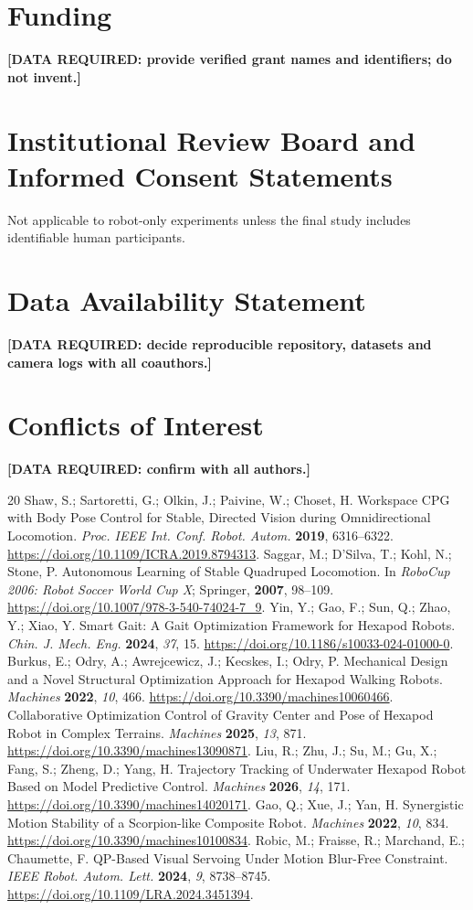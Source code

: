 \documentclass[11pt,a4paper]{article}
\newcommand{\todoexp}[1]{\textcolor{red!70!black}{\textbf{[DATA REQUIRED: #1]}}}
\begin{document}
\section*{Funding}
\todoexp{provide verified grant names and identifiers; do not invent.}
\section*{Institutional Review Board and Informed Consent Statements}
Not applicable to robot-only experiments unless the final study includes identifiable human participants.
\section*{Data Availability Statement}
\todoexp{decide reproducible repository, datasets and camera logs with all coauthors.}
\section*{Conflicts of Interest}
\todoexp{confirm with all authors.}
\begin{thebibliography}{20}
 Shaw, S.; Sartoretti, G.; Olkin, J.; Paivine, W.; Choset, H. Workspace CPG with Body Pose Control for Stable, Directed Vision during Omnidirectional Locomotion. \emph{Proc. IEEE Int. Conf. Robot. Autom.} \textbf{2019}, 6316--6322. \url{https://doi.org/10.1109/ICRA.2019.8794313}.
 Saggar, M.; D'Silva, T.; Kohl, N.; Stone, P. Autonomous Learning of Stable Quadruped Locomotion. In \emph{RoboCup 2006: Robot Soccer World Cup X}; Springer, \textbf{2007}, 98--109. \url{https://doi.org/10.1007/978-3-540-74024-7_9}.
 Yin, Y.; Gao, F.; Sun, Q.; Zhao, Y.; Xiao, Y. Smart Gait: A Gait Optimization Framework for Hexapod Robots. \emph{Chin. J. Mech. Eng.} \textbf{2024}, \emph{37}, 15. \url{https://doi.org/10.1186/s10033-024-01000-0}.
 Burkus, E.; Odry, A.; Awrejcewicz, J.; Kecskes, I.; Odry, P. Mechanical Design and a Novel Structural Optimization Approach for Hexapod Walking Robots. \emph{Machines} \textbf{2022}, \emph{10}, 466. \url{https://doi.org/10.3390/machines10060466}.
 Collaborative Optimization Control of Gravity Center and Pose of Hexapod Robot in Complex Terrains. \emph{Machines} \textbf{2025}, \emph{13}, 871. \url{https://doi.org/10.3390/machines13090871}.
 Liu, R.; Zhu, J.; Su, M.; Gu, X.; Fang, S.; Zheng, D.; Yang, H. Trajectory Tracking of Underwater Hexapod Robot Based on Model Predictive Control. \emph{Machines} \textbf{2026}, \emph{14}, 171. \url{https://doi.org/10.3390/machines14020171}.
 Gao, Q.; Xue, J.; Yan, H. Synergistic Motion Stability of a Scorpion-like Composite Robot. \emph{Machines} \textbf{2022}, \emph{10}, 834. \url{https://doi.org/10.3390/machines10100834}.
 Robic, M.; Fraisse, R.; Marchand, E.; Chaumette, F. QP-Based Visual Servoing Under Motion Blur-Free Constraint. \emph{IEEE Robot. Autom. Lett.} \textbf{2024}, \emph{9}, 8738--8745. \url{https://doi.org/10.1109/LRA.2024.3451394}.
\end{thebibliography}
\end{document}
